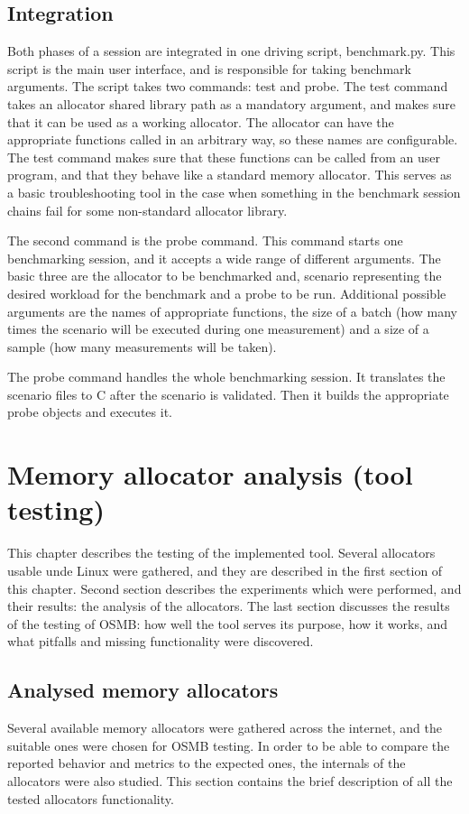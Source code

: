 \section{Integration}
Both phases of a session are integrated in one driving script, benchmark.py. This script is the main user interface, and is responsible for taking benchmark arguments. The script takes two commands: test and probe. The test command takes an allocator shared library path as a mandatory argument, and makes sure that it can be used as a working allocator. The allocator can have the appropriate functions called in an arbitrary way, so these names are configurable. The test command makes sure that these functions can be called from an user program, and that they behave like a standard memory allocator. This serves as a basic troubleshooting tool in the case when something in the benchmark session chains fail for some non-standard allocator library.

The second command is the probe command. This command starts one benchmarking session, and it accepts a wide range of different arguments. The basic three are the allocator to be benchmarked and, scenario representing the desired workload for the benchmark and a probe to be run. Additional possible arguments are the names of appropriate functions, the size of a batch (how many times the scenario will be executed during one measurement) and a size of a sample (how many measurements will be taken).

The probe command handles the whole benchmarking session. It translates the scenario files to C after the scenario is validated. Then it builds the appropriate probe objects and executes it.

\chapter{Memory allocator analysis (tool testing)}
This chapter describes the testing of the implemented tool. Several allocators usable unde Linux were gathered, and they are described in the first section of this chapter. Second section describes the experiments which were performed, and their results: the analysis of the allocators. The last section discusses the results of the testing of OSMB: how well the tool serves its purpose, how it works, and what pitfalls and missing functionality were discovered.

\section{Analysed memory allocators}
Several available memory allocators were gathered across the internet, and the suitable ones were chosen for OSMB testing. In order to be able to compare the reported behavior and metrics to the expected ones, the internals of the allocators were also studied. This section contains the brief description of all the tested allocators functionality.

